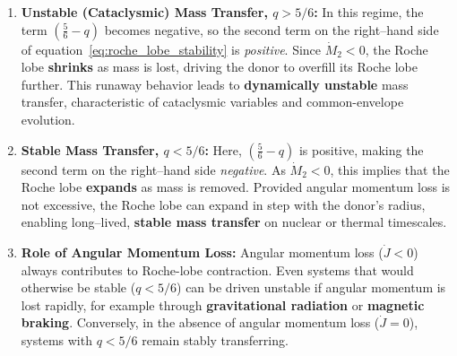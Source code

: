 \begin{enumerate}
    \item \textbf{Unstable (Cataclysmic) Mass Transfer, $q > 5/6$:}  
    In this regime, the term $\left(\tfrac{5}{6} - q\right)$ becomes negative, so the second term on the right--hand side of 
    equation~\eqref{eq:roche_lobe_stability} is \emph{positive}.  
    Since $\dot{M}_2 < 0$, the Roche lobe \textbf{shrinks} as mass is lost, driving the donor to overfill its Roche lobe further.  
    This runaway behavior leads to \textbf{dynamically unstable} mass transfer, characteristic of cataclysmic variables and common-envelope evolution.

    \item \textbf{Stable Mass Transfer, $q < 5/6$:}  
    Here, $\left(\tfrac{5}{6} - q\right)$ is positive, making the second term on the right--hand side \emph{negative}.  
    As $\dot{M}_2 < 0$, this implies that the Roche lobe \textbf{expands} as mass is removed.  
    Provided angular momentum loss is not excessive, the Roche lobe can expand in step with the donor’s radius, 
    enabling long--lived, \textbf{stable mass transfer} on nuclear or thermal timescales.

    \item \textbf{Role of Angular Momentum Loss:}  
    Angular momentum loss ($\dot{J}<0$) always contributes to Roche-lobe contraction.  
    Even systems that would otherwise be stable ($q < 5/6$) can be driven unstable if angular momentum is lost rapidly, 
    for example through \textbf{gravitational radiation} or \textbf{magnetic braking}.  
    Conversely, in the absence of angular momentum loss ($\dot{J}=0$), systems with $q < 5/6$ remain stably transferring.
\end{enumerate}


